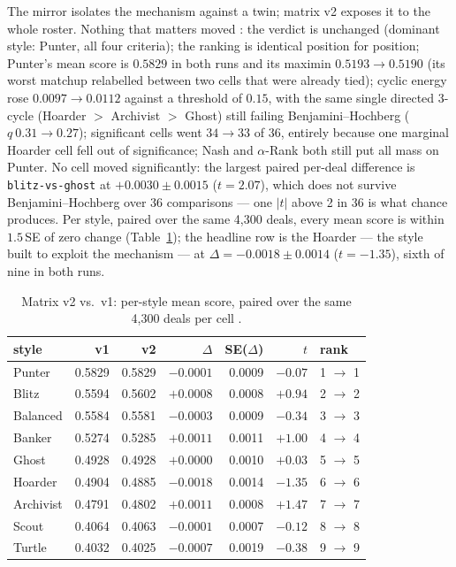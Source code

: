 \documentclass[11pt]{article}
\newcommand{\code}[1]{\texttt{#1}}
\begin{document}
The mirror isolates the mechanism against a twin; matrix v2 exposes it to the
whole roster. Nothing that matters moved \cite{styles}: the verdict is
unchanged (dominant style: Punter, all four criteria); the ranking is
identical position for position; Punter's mean score is $0.5829$ in both runs
and its maximin $0.5193 \to 0.5190$ (its worst matchup relabelled between two
cells that were already tied); cyclic energy rose $0.0097 \to 0.0112$ against
a threshold of $0.15$, with the same single directed 3-cycle
(Hoarder $>$ Archivist $>$ Ghost) still failing Benjamini--Hochberg
($q\ 0.31 \to 0.27$); significant cells went $34 \to 33$ of 36, entirely
because one marginal Hoarder cell fell out of significance; Nash and
$\alpha$-Rank both still put all mass on Punter. No cell moved significantly:
the largest paired per-deal difference is \code{blitz-vs-ghost} at
$+0.0030 \pm 0.0015$ ($t = 2.07$), which does not survive
Benjamini--Hochberg over 36 comparisons --- one $|t|$ above 2 in 36 is what
chance produces. Per style, paired over the same 4{,}300 deals, every mean
score is within $1.5$\,SE of zero change (Table~\ref{tab:v2}); the headline
row is the Hoarder --- the style built to exploit the mechanism --- at
$\Delta = -0.0018 \pm 0.0014$ ($t = -1.35$), sixth of nine in both runs.

\begin{table}[ht]
\centering
\caption{Matrix v2 vs.\ v1: per-style mean score, paired over the same
4{,}300 deals per cell \cite{styles,artifacts}.}
\label{tab:v2}
\small
\begin{tabular}{@{}l r r r r r l@{}}
\toprule
style & v1 & v2 & $\Delta$ & SE($\Delta$) & $t$ & rank \\
\midrule
Punter    & 0.5829 & 0.5829 & $-0.0001$ & 0.0009 & $-0.07$ & 1 $\to$ 1 \\
Blitz     & 0.5594 & 0.5602 & $+0.0008$ & 0.0008 & $+0.94$ & 2 $\to$ 2 \\
Balanced  & 0.5584 & 0.5581 & $-0.0003$ & 0.0009 & $-0.34$ & 3 $\to$ 3 \\
Banker    & 0.5274 & 0.5285 & $+0.0011$ & 0.0011 & $+1.00$ & 4 $\to$ 4 \\
Ghost     & 0.4928 & 0.4928 & $+0.0000$ & 0.0010 & $+0.03$ & 5 $\to$ 5 \\
Hoarder   & 0.4904 & 0.4885 & $-0.0018$ & 0.0014 & $-1.35$ & 6 $\to$ 6 \\
Archivist & 0.4791 & 0.4802 & $+0.0011$ & 0.0008 & $+1.47$ & 7 $\to$ 7 \\
Scout     & 0.4064 & 0.4063 & $-0.0001$ & 0.0007 & $-0.12$ & 8 $\to$ 8 \\
Turtle    & 0.4032 & 0.4025 & $-0.0007$ & 0.0019 & $-0.38$ & 9 $\to$ 9 \\
\bottomrule
\end{tabular}
\end{table}
\end{document}
